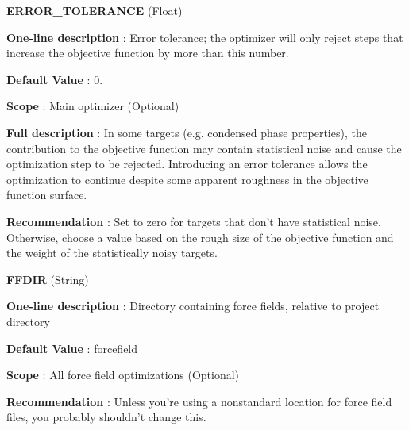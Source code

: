\begin{DoxyItemize}
\item {\bfseries  E\-R\-R\-O\-R\-\_\-\-T\-O\-L\-E\-R\-A\-N\-C\-E } (Float) \par
{\bfseries  One-\/line description }\-: Error tolerance; the optimizer will only reject steps that increase the objective function by more than this number. \par
{\bfseries  Default Value }\-: 0. \par
{\bfseries  Scope }\-: Main optimizer (Optional) \par
{\bfseries  Full description }\-: In some targets (e.\-g. condensed phase properties), the contribution to the objective function may contain statistical noise and cause the optimization step to be rejected. Introducing an error tolerance allows the optimization to continue despite some apparent roughness in the objective function surface. \par
{\bfseries  Recommendation }\-: Set to zero for targets that don't have statistical noise. Otherwise, choose a value based on the rough size of the objective function and the weight of the statistically noisy targets.\end{DoxyItemize}
\begin{DoxyItemize}
\item {\bfseries  F\-F\-D\-I\-R } (String) \par
{\bfseries  One-\/line description }\-: Directory containing force fields, relative to project directory \par
{\bfseries  Default Value }\-: forcefield \par
{\bfseries  Scope }\-: All force field optimizations (Optional) \par
{\bfseries  Recommendation }\-: Unless you're using a nonstandard location for force field files, you probably shouldn't change this.\end{DoxyItemize}
